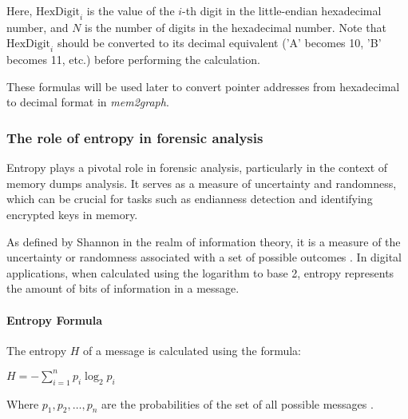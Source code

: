     Here, $ \text{HexDigit}_{i} $ is the value of the \(i\)-th digit in the little-endian hexadecimal number, and \( N \) is the number of digits in the hexadecimal number. Note that $ \text{HexDigit}_{i} $ should be converted to its decimal equivalent ('A' becomes 10, 'B' becomes 11, etc.) before performing the calculation.

    These formulas will be used later to convert pointer addresses from hexadecimal to decimal format in \textit{mem2graph}.

    \subsubsection{The role of entropy in forensic analysis}

    Entropy plays a pivotal role in forensic analysis, particularly in the context of memory dumps analysis. It serves as a measure of uncertainty and randomness, which can be crucial for tasks such as endianness detection and identifying encrypted keys in memory.

    As defined by Shannon in the realm of information theory, it is a measure of the uncertainty or randomness associated with a set of possible outcomes \cite{InferenceEndianness17} \cite{TheoryOfCommunicationShannon1948}. In digital applications, when calculated using the logarithm to base 2, entropy represents the amount of bits of information in a message.

    \begin{minipage}{\dimexpr\linewidth-20pt}
        \paragraph{Entropy Formula}
        The entropy \( H \) of a message is calculated using the formula:
        \par %
        
        \vspace{2em}  %
        \begin{center}
            $
            H = - \sum_{i=1}^{n} p_i \log_2 p_i
            $
        \end{center}
        \vspace{1em}

        Where $ p_1, p_2, \ldots, p_n $ are the probabilities of the set of all possible messages \cite{InferenceEndianness17}.
    \end{minipage}

